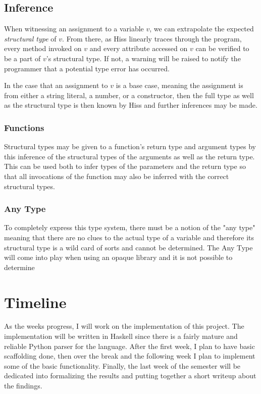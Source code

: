 \documentclass{article}
\begin{document}
\begin{multicols}{2}
\subsection*{Inference}

When witnessing an assignment to a variable $v$, we can extrapolate the
expected \emph{structural type} of $v$. From there, as Hiss linearly traces
through the program, every method invoked on $v$ and every attribute accessed
on $v$ can be verified to be a part of $v$'s structural type. If not, a warning
will be raised to notify the programmer that a potential type error has
occurred.

In the case that an assignment to $v$ is a base case, meaning the assignment
is from either a string literal, a number, or a constructor, then the full
type as well as the structural type is then known by Hiss and further inferences
may be made.

\subsubsection*{Functions}

Structural types may be given to a function's return type and argument types by
this inference of the structural types of the arguments as well as the return
type. This can be used both to infer types of the parameters and the return type
so that all invocations of the function may also be inferred with the correct
structural types.

\subsubsection*{Any Type}

To completely express this type system, there must be a notion of the "any type"
meaning that there are no clues to the actual type of a variable and therefore
its structural type is a wild card of sorts and cannot be determined. The Any Type
will come into play when using an opaque library and it is not possible to determine

\section*{Timeline}

As the weeks progress, I will work on the implementation of this project. The
implementation will be written in Haskell since there is a fairly mature and reliable
Python parser for the language. After the first week, I plan to have basic scaffolding
done, then over the break and the following week I plan to implement some of the
basic functionality. Finally, the last week of the semester will be dedicated into
formalizing the results and putting together a short writeup about the findings.




\vspace{\textheight}
\end{multicols}
\end{document}
